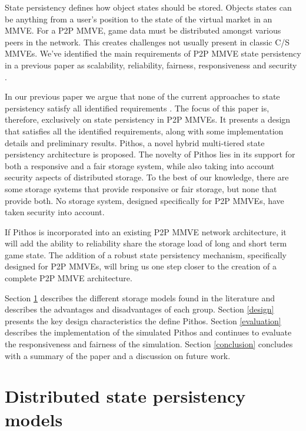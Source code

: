 \documentclass[10pt,a4paper,conference]{IEEEtran}
\begin{document}
State persistency defines how object states should be stored. Objects states can be anything from a user's position to the state of the virtual
market in an MMVE. For a P2P MMVE, game data must be distributed amongst various peers in the network. This creates challenges not usually present in
classic C/S MMVEs. We've identified the main requirements of P2P MMVE state persistency in a previous paper as scalability, reliability, fairness,
responsiveness and security \cite{gilmore_p2p_mmog_state_persistency}.

In our previous paper we argue that none of the current approaches to state persistency satisfy all identified requirements
\cite{gilmore_p2p_mmog_state_persistency}. The focus of this paper is, therefore, exclusively on state persistency in P2P MMVEs. It presents a design
that satisfies all the identified requirements, along with some implementation details and preliminary results. Pithos, a novel hybrid multi-tiered
state persistency architecture is proposed. The novelty of Pithos lies in its support for both a responsive and a fair storage system, while also
taking into account security aspects of distributed storage. To the best of our knowledge, there are some storage systems that provide responsive or
fair storage, but none that provide both. No storage system, designed specifically for P2P MMVEs, have taken security into account.

If Pithos is incorporated into an existing P2P MMVE network architecture, it will add the ability to reliability share the storage load of long and
short term game state. The addition of a robust state persistency mechanism, specifically designed for P2P MMVEs, will bring us one step closer to
the creation of a complete P2P MMVE architecture.

Section \ref{current_models} describes the different storage models found in the literature and describes the advantages and disadvantages of each
group.
%
Section \ref{design} presents the key design characteristics the define Pithos.
%
Section \ref{evaluation} describes the implementation of the simulated Pithos and continues to evaluate the responsiveness and fairness of the
simulation.
%
Section \ref{conclusion} concludes with a summary of the paper and a discussion on future work.

\section{Distributed state persistency models}
\label{current_models}
\end{document}

